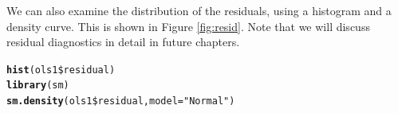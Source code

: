 \documentclass[11pt,openany]{book}\usepackage[]{graphicx}\usepackage[]{color}
\makeatletter
\newcommand{\hlstr}[1]{\textcolor[rgb]{0.192,0.494,0.8}{#1}}%
\newcommand{\hlopt}[1]{\textcolor[rgb]{0,0,0}{#1}}%
\newcommand{\hlstd}[1]{\textcolor[rgb]{0.345,0.345,0.345}{#1}}%
\newcommand{\hlkwc}[1]{\textcolor[rgb]{0.333,0.667,0.333}{#1}}%
\newcommand{\hlkwd}[1]{\textcolor[rgb]{0.737,0.353,0.396}{\textbf{#1}}}%
\newenvironment{kframe}{%
 \def\at@end@of@kframe{}%
 \ifinner\ifhmode%
  \def\at@end@of@kframe{\end{minipage}}%
  \begin{minipage}{\columnwidth}%
 \fi\fi%
 \def\FrameCommand##1{\hskip\@totalleftmargin \hskip-\fboxsep
 \colorbox{shadecolor}{##1}\hskip-\fboxsep
     \hskip-\linewidth \hskip-\@totalleftmargin \hskip\columnwidth}%
 \MakeFramed {\advance\hsize-\width
   \@totalleftmargin\z@ \linewidth\hsize
   \@setminipage}}%
 {\par\unskip\endMakeFramed%
 \at@end@of@kframe}
\newenvironment{knitrout}{}{} %
\renewenvironment{knitrout}{\begin{singlespace}}{\end{singlespace}}
\makeatother
\begin{document}
We can also examine the distribution of the residuals, using a histogram and a density curve. This is shown in Figure \ref{fig:resid}. Note that we will discuss residual diagnostics in detail in future chapters. 

\begin{knitrout}
\color{fgcolor}\begin{kframe}
\begin{alltt}
\hlkwd{hist}\hlstd{(ols1}\hlopt{\$}\hlstd{residual)}
\hlkwd{library}\hlstd{(sm)}
\hlkwd{sm.density}\hlstd{(ols1}\hlopt{\$}\hlstd{residual,} \hlkwc{model} \hlstd{=} \hlstr{"Normal"}\hlstd{)}
\end{alltt}
\end{kframe}
\end{knitrout}
 
\end{document}
